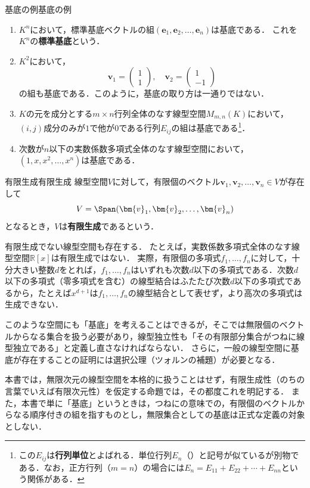 \begin{example}{基底の例}{基底の例}
  \begin{enumerate}[label=(\arabic*),leftmargin=3.2em]
    \item $K^n$において，標準基底ベクトルの組$(\bm{e}_1, \bm{e}_2, \dots, \bm{e}_n)$は基底である．
    これを$K^n$の\textbf{標準基底}という．

    \item $K^2$において，
    \[
      \bm{v}_1 = \begin{pmatrix} 1 \\ 1 \end{pmatrix}, \quad
      \bm{v}_2 = \begin{pmatrix} 1 \\ -1 \end{pmatrix}
    \]
    の組も基底である．このように，基底の取り方は一通りではない．

    \item $K$の元を成分とする$m \times n$行列全体のなす線型空間$M_{m,n}(K)$において，$(i,j)$成分のみが$1$で他が$0$である行列$E_{ij}$の組は基底である\footnote{この$E_{ij}$は\textbf{行列単位}とよばれる．単位行列$E_n$（）と記号が似ているが別物である．なお，正方行列（$m = n$）の場合には$E_n = E_{11} + E_{22} + \cdots + E_{nn}$という関係がある．}．

    \item 次数が$n$以下の実数係数多項式全体のなす線型空間において，$(1, x, x^2, \dots, x^n)$は基底である．
  \end{enumerate}
\end{example}

\begin{definition}{有限生成}{有限生成}
  線型空間$V$に対して，有限個のベクトル$\bm{v}_1, \bm{v}_2, \dots, \bm{v}_n \in V$が存在して
  \[
    V = \Span(\bm{v}_1, \bm{v}_2, \dots, \bm{v}_n)
  \]
  となるとき，$V$は\textbf{有限生成}であるという．
\end{definition}

\begin{mycolumn}
  有限生成でない線型空間も存在する．
  たとえば，実数係数多項式全体のなす線型空間$\mathbb{R}[x]$は有限生成ではない．
  実際，有限個の多項式$f_1, \dots, f_n$に対して，十分大きい整数$d$をとれば，$f_1, \dots, f_n$はいずれも次数$d$以下の多項式である．次数$d$以下の多項式（零多項式を含む）の線型結合はふたたび次数$d$以下の多項式であるから，たとえば$x^{d+1}$は$f_1, \dots, f_n$の線型結合として表せず，より高次の多項式は生成できない．

  このような空間にも「基底」を考えることはできるが，そこでは無限個のベクトルからなる集合を扱う必要があり，線型独立性も「その有限部分集合がつねに線型独立である」と定義し直さなければならない．
  さらに，一般の線型空間に基底が存在することの証明には選択公理（ツォルンの補題）が必要となる．

  本書では，無限次元の線型空間を本格的に扱うことはせず，有限生成性（のちの言葉でいえば有限次元性）を仮定する命題では，その都度これを明記する．
  また，本書で単に「基底」というときは，つねにの意味での，有限個のベクトルからなる順序付きの組を指すものとし，無限集合としての基底は正式な定義の対象としない．
\end{mycolumn}

